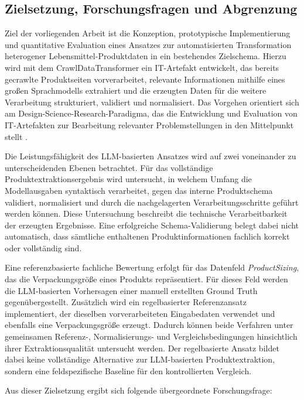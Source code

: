 \subsection{Zielsetzung, Forschungsfragen und Abgrenzung}

Ziel der vorliegenden Arbeit ist die Konzeption, prototypische Implementierung und quantitative Evaluation eines Ansatzes zur automatisierten Transformation heterogener Lebensmittel-Produktdaten in ein bestehendes Zielschema. Hierzu wird mit dem CrawlDataTransformer ein IT-Artefakt entwickelt, das bereits gecrawlte Produktseiten vorverarbeitet, relevante Informationen mithilfe eines großen Sprachmodells extrahiert und die erzeugten Daten für die weitere Verarbeitung strukturiert, validiert und normalisiert. Das Vorgehen orientiert sich am Design-Science-Research-Paradigma, das die Entwicklung und Evaluation von IT-Artefakten zur Bearbeitung relevanter Problemstellungen in den Mittelpunkt stellt \cite{hevner2004design}.

Die Leistungsfähigkeit des LLM-basierten Ansatzes wird auf zwei voneinander zu unterscheidenden Ebenen betrachtet. Für das vollständige Produktextraktionsergebnis wird untersucht, in welchem Umfang die Modellausgaben syntaktisch verarbeitet, gegen das interne Produktschema validiert, normalisiert und durch die nachgelagerten Verarbeitungsschritte geführt werden können. Diese Untersuchung beschreibt die technische Verarbeitbarkeit der erzeugten Ergebnisse. Eine erfolgreiche Schema-Validierung belegt dabei nicht automatisch, dass sämtliche enthaltenen Produktinformationen fachlich korrekt oder vollständig sind.

Eine referenzbasierte fachliche Bewertung erfolgt für das Datenfeld \textit{ProductSizing}, das die Verpackungsgröße eines Produkts repräsentiert. Für dieses Feld werden die LLM-basierten Vorhersagen einer manuell erstellten Ground Truth gegenübergestellt. Zusätzlich wird ein regelbasierter Referenzansatz implementiert, der dieselben vorverarbeiteten Eingabedaten verwendet und ebenfalls eine Verpackungsgröße erzeugt. Dadurch können beide Verfahren unter gemeinsamen Referenz-, Normalisierungs- und Vergleichsbedingungen hinsichtlich ihrer Extraktionsqualität untersucht werden. Der regelbasierte Ansatz bildet dabei keine vollständige Alternative zur LLM-basierten Produktextraktion, sondern eine feldspezifische Baseline für den kontrollierten Vergleich.

Aus dieser Zielsetzung ergibt sich folgende übergeordnete Forschungsfrage:

